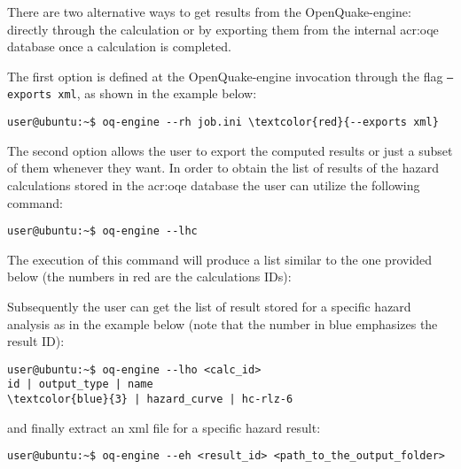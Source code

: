 There are two alternative ways to get results from the OpenQuake-engine:
directly through the calculation or by exporting them from the internal
\gls{acr:oqe} database once a calculation is completed.

The first option is defined at the OpenQuake-engine invocation through the
flag \texttt{--exports xml}, as shown in the example below:

\begin{Verbatim}[frame=single, commandchars=\\\{\}, fontsize=\small]
user@ubuntu:~$ oq-engine --rh job.ini \textcolor{red}{--exports xml}
\end{Verbatim}

The second option allows the user to export the computed results or just a
subset of them whenever they want. In order to obtain the list of results of
the hazard calculations stored in the \gls{acr:oqe} database the user can
utilize the following command:

\begin{Verbatim}[frame=single, commandchars=\\\{\}, fontsize=\small]
user@ubuntu:~$ oq-engine --lhc
\end{Verbatim}

The execution of this command will produce a list similar to the one provided
below (the numbers in red are the calculations IDs):



Subsequently the user can get the list of result stored for a specific hazard
analysis as in the example below (note that the number in blue emphasizes the
result ID):

\begin{Verbatim}[frame=single, commandchars=\\\{\}, fontsize=\small]
user@ubuntu:~$ oq-engine --lho <calc_id>
id | output_type | name
\textcolor{blue}{3} | hazard_curve | hc-rlz-6
\end{Verbatim}

and finally extract an xml file for a specific hazard result:

\begin{Verbatim}[frame=single, commandchars=\\\{\}, fontsize=\small]
user@ubuntu:~$ oq-engine --eh <result_id> <path_to_the_output_folder>
\end{Verbatim}


